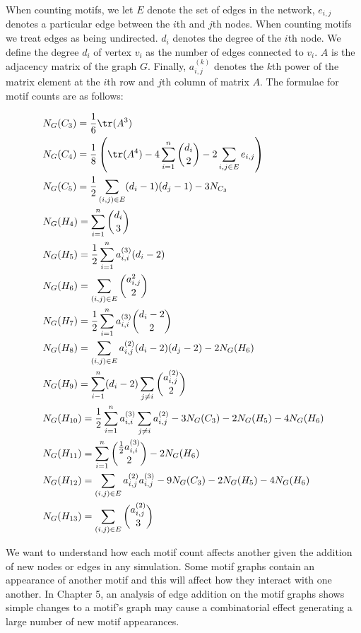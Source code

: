\vspace{3mm}

When counting motifs, we let $E$ denote the set of edges in the network, $e_{i,j}$ denotes a particular edge between the 
$i$th and $j$th nodes. When counting motifs we treat edges as being undirected. $d_i$ denotes the degree of the $i$th node. We define the degree $d_i$ of vertex $v_i$ as the number of 
edges connected to $v_i$. $A$ is the adjacency matrix of the
 graph $G$. Finally, $a^{(k)}_{i,j}$ denotes the $k$th power of the matrix 
element at the $i$th row and $j$th column of matrix $A$. The formulae for motif counts are as follows:

\newpage

\begin{align*}
    &N_G(C_{3}) = \frac{1}{6} \tr({A^3}) \\
    &N_G(C_{4}) = \frac{1}{8} \left(\tr(A^4) -4\sum^{n}_{i=1} {d_i \choose 2} - 2\sum_{i,j \in E} e_{i,j} \right)\\
    &N_G(C_{5}) = \frac{1}{2}\sum_{(i,j)\in E} (d_i - 1)(d_j - 1) - 3 N_{C_{3}} \\
    &N_G(H_{4}) = \sum^{n}_{i=1} {d_i \choose 3} \\
    &N_G(H_{5}) = \frac{1}{2} \sum^{n}_{i=1} a^{(3)}_{i,i} (d_i-2)\\
    &N_G(H_{6})= \sum_{(i,j)\in E}{a^{2}_{i,j} \choose 2 }\\
    &N_G(H_{7}) = \frac{1}{2} \sum^{n}_{i=1} a^{(3)}_{i,i} {{d_i-2} \choose 2}\\
    &N_G(H_{8})= \sum_{(i,j)\in E} a^{(2)}_{i,j} (d_i-2)(d_j-2) - 2 N_G(H_{6})\\
    &N_G(H_{9}) = \sum^{n}_{i-1}(d_i-2) \sum_{j \neq i} {a^{(2)}_{i,j} \choose 2 }\\
    &N_G(H_{10}) = \frac{1}{2}\sum^{n}_{i=1}a^{(3)}_{i,i} \sum_{j \neq i} a^{(2)}_{i,j} - 3 N_G(C_{3})- 2N_G(H_{5}) -4N_G(H_{6})\\
    &N_G(H_{11}) = \sum^{n}_{i=1} {\frac{1}{2}a^{(3)}_{i,i} \choose 2} - 2N_G(H_{6})\\
    &N_G(H_{12}) = \sum_{(i,j)\in E} a^{(2)}_{i,j} a^{(3)}_{i,j} - 9N_G(C_{3}) -2N_G(H_{5})-4N_G(H_{6})\\
    &N_G(H_{13}) = \sum_{(i,j)\in E} {a^{(2)}_{i,j} \choose 3}\\
\end{align*}

We want to understand how each motif count affects another given the addition of new nodes or edges
in any simulation. Some motif graphs contain an appearance of another motif and this will affect how they interact with one another. In Chapter 5, 
an analysis of edge addition on the motif graphs shows simple changes
to a motif's graph may cause a combinatorial effect generating a large number of new motif appearances.

